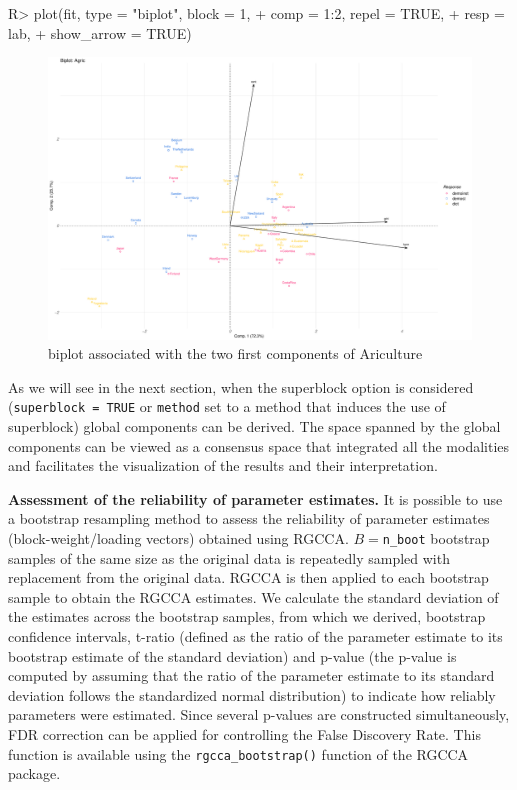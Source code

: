 \documentclass[
]{jss}
\begin{document}
\begin{CodeChunk}
\begin{CodeInput}
R> plot(fit, type = "biplot", block = 1, 
+      comp = 1:2, repel = TRUE, 
+      resp = lab, 
+      show_arrow = TRUE)
\end{CodeInput}
\begin{figure}

{\centering \includegraphics{RGCCA_vignette_files/figure-latex/unnamed-chunk-11-1} 

}

\caption[biplot associated with the two first components of Ariculture]{biplot associated with the two first components of Ariculture}\label{fig:unnamed-chunk-11}
\end{figure}
\end{CodeChunk}

\normalsize

As we will see in the next section, when the superblock option is
considered (\texttt{superblock\ =\ TRUE} or \texttt{method} set to a
method that induces the use of superblock) global components can be
derived. The space spanned by the global components can be viewed as a
consensus space that integrated all the modalities and facilitates the
visualization of the results and their interpretation.

\textbf{Assessment of the reliability of parameter estimates.} It is
possible to use a bootstrap resampling method to assess the reliability
of parameter estimates (block-weight/loading vectors) obtained using
RGCCA. \(B=\)\texttt{n\_boot} bootstrap samples of the same size as the
original data is repeatedly sampled with replacement from the original
data. RGCCA is then applied to each bootstrap sample to obtain the RGCCA
estimates. We calculate the standard deviation of the estimates across
the bootstrap samples, from which we derived, bootstrap confidence
intervals, t-ratio (defined as the ratio of the parameter estimate to
its bootstrap estimate of the standard deviation) and p-value (the
p-value is computed by assuming that the ratio of the parameter estimate
to its standard deviation follows the standardized normal distribution)
to indicate how reliably parameters were estimated. Since several
p-values are constructed simultaneously, FDR correction can be applied
for controlling the False Discovery Rate. This function is available
using the \texttt{rgcca\_bootstrap()} function of the RGCCA package.
\end{document}
